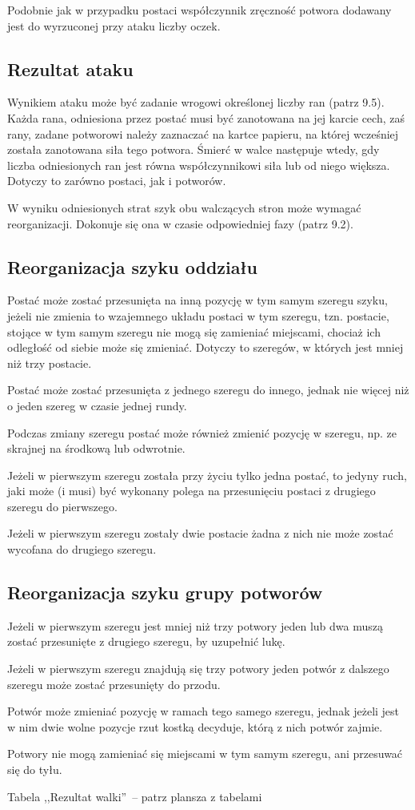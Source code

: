 Podobnie jak w przypadku postaci współczynnik zręczność potwora dodawany jest do wyrzuconej przy ataku liczby oczek.

\subsection{Rezultat ataku}

Wynikiem ataku może być zadanie wrogowi określonej liczby ran (patrz 9.5).
Każda rana, odniesiona przez postać musi być zanotowana na jej karcie cech, zaś rany, zadane potworowi należy zaznaczać na kartce papieru, na której wcześniej została zanotowana siła tego potwora.
Śmierć w walce następuje wtedy, gdy liczba odniesionych ran jest równa współczynnikowi siła lub od niego większa.
Dotyczy to zarówno postaci, jak i potworów.

W wyniku odniesionych strat szyk obu walczących stron może wymagać reorganizacji.
Dokonuje się ona w czasie odpowiedniej fazy (patrz 9.2).

\subsection{Reorganizacja szyku oddziału}

Postać może zostać przesunięta na inną pozycję w tym samym szeregu szyku, jeżeli nie zmienia to wzajemnego układu postaci w tym szeregu, tzn. postacie, stojące w tym samym szeregu nie mogą się zamieniać miejscami, chociaż ich odległość od siebie może się zmieniać.
Dotyczy to szeregów, w których jest mniej niż trzy postacie.

Postać może zostać przesunięta z jednego szeregu do innego, jednak nie więcej niż o jeden szereg w czasie jednej rundy.

Podczas zmiany szeregu postać może również zmienić pozycję w szeregu, np. ze skrajnej na środkową lub odwrotnie.

Jeżeli w pierwszym szeregu została przy życiu tylko jedna postać, to jedyny ruch, jaki może (i musi) być wykonany polega na przesunięciu postaci z drugiego szeregu do pierwszego.

Jeżeli w pierwszym szeregu zostały dwie postacie żadna z nich nie może zostać wycofana do drugiego szeregu.

\subsection{Reorganizacja szyku grupy potworów}

Jeżeli w pierwszym szeregu jest mniej niż trzy potwory jeden lub dwa muszą zostać przesunięte z drugiego szeregu, by uzupełnić lukę.

Jeżeli w pierwszym szeregu znajdują się trzy potwory jeden potwór z dalszego szeregu może zostać przesunięty do przodu.

Potwór może zmieniać pozycję w ramach tego samego szeregu, jednak jeżeli jest w nim dwie wolne pozycje rzut kostką decyduje, którą z nich potwór zajmie.

Potwory nie mogą zamieniać się miejscami w tym samym szeregu, ani przesuwać się do tyłu.

Tabela ,,Rezultat walki''~-- patrz plansza z tabelami

